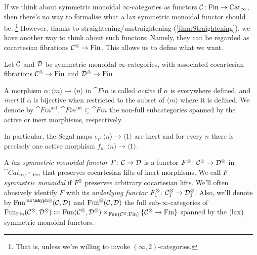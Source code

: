 If we think about symmetric monoidal $\infty$-categories as functors $\mathcal{C}\colon \mathrm{Fin}\rightarrow \mathrm{Cat}_\infty$, then there's no way to formalise what a lax symmetric monoidal functor should be.%
%
\footnote{That is, unless we're willing to invoke $(\infty,2)$-categories.}
However, thanks to straightening/unstraightening (\cref{thm:Straightening}), we have another way to think about such functors: Namely, they can be regarded as cocartesian fibrations $\mathcal{C}^\otimes\rightarrow \mathrm{Fin}$. This allows us to define what we want.
\begin{defi}\label{def:LaxSymmetricMonoidal}
	Let $\mathcal{C}$ and $\mathcal{D}$ be symmetric monoidal $\infty$-categories, with associated cocartesian fibrations $\mathcal{C}^\otimes\rightarrow \mathrm{Fin}$ and $\mathcal{D}^\otimes\rightarrow \mathrm{Fin}$.
	\begin{alphanumerate}
		\item A morphism $\alpha\colon \langle m\rangle\rightarrow \langle n\rangle$ in $\cat{Fin}$ is called \emph{active} if $\alpha$ is everywhere defined, and \emph{inert} if $\alpha$ is bijective when restricted to the subset of $\langle m\rangle$ where it is defined. We denote by $\cat{Fin}^\mathrm{act},\cat{Fin}^\mathrm{int}\subseteq \cat{Fin}$ the non-full subcategories spanned by the active or inert morphisms, respectively.
	\end{alphanumerate}
	In particular, the Segal maps $e_i\colon \langle n\rangle \rightarrow \langle 1\rangle$ are inert and for every $n$ there is precisely one active morphism $f_n\colon \langle n\rangle \rightarrow \langle 1\rangle$.
	\begin{alphanumerate}[resume]
		\item A \emph{lax symmetric monoidal functor $F\colon \mathcal{C}\rightarrow \mathcal{D}$} is a functor $F^\otimes\colon \mathcal{C}^\otimes\rightarrow \mathcal{D}^\otimes$ in $\cat{Cat}_{\infty/\cat{Fin}}$ that preserves cocartesian lifts of inert morphisms. We call $F$ \emph{ symmetric monoidal} if $F^\otimes$ preserves arbitrary cocartesian lifts. We'll often abusively identify $F$ with its \emph{underlying functor} $F^\otimes_1\colon \mathcal{C}_1^\otimes\rightarrow \mathcal{D}_1^\otimes$. Also, we'll denote by $\Fun^{\lax}(\Cc,\Dd)$ and $\operatorname{Fun}^\otimes(\mathcal{C},\mathcal{D})$ the full sub-$\infty$-categories of $\operatorname{Fun}_{\mathrm{Fin}}(\mathcal{C}^\otimes,\mathcal{D}^\otimes)\coloneqq \operatorname{Fun}(\mathcal{C}^\otimes,\mathcal{D}^\otimes)\times_{\operatorname{Fun}(\mathcal{C}^\otimes,\mathrm{Fin})}\{\mathcal{C}^\otimes\rightarrow \mathrm{Fin}\}$ spanned by the (lax) symmetric monoidal functors.
	\end{alphanumerate}
\end{defi}
